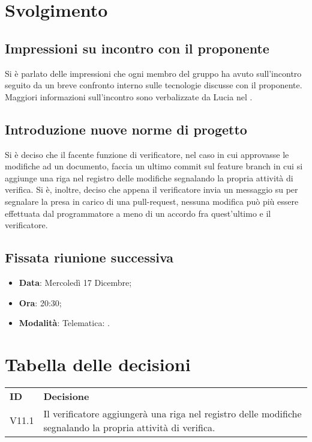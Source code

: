 \documentclass[]{article}
\begin{document}
	\newpage

	\section{Svolgimento}
		\subsection{Impressioni su incontro con il proponente}
		Si è parlato delle impressioni che ogni membro del gruppo ha avuto sull'incontro seguito da un breve confronto interno sulle tecnologie discusse con il proponente. Maggiori informazioni sull'incontro sono verbalizzate da Lucia nel .\\

		\subsection{Introduzione nuove norme di progetto}
		Si è deciso che il facente funzione di verificatore, nel caso in cui approvasse le modifiche ad un documento, faccia un ultimo commit sul feature branch in cui si aggiunge una riga nel registro delle modifiche segnalando la propria attività di verifica.
		Si è, inoltre, deciso che appena il verificatore invia un messaggio su  per segnalare la presa in carico di una pull-request, nessuna modifica può più essere effettuata dal programmatore a meno di un accordo fra quest'ultimo e il verificatore.\\

		\subsection{Fissata riunione successiva}
		\begin{itemize}
			\item \textbf{Data}: Mercoledì 17 Dicembre;
			\item \textbf{Ora}: 20:30;
			\item \textbf{Modalità}: Telematica: .
		\end{itemize}
	
	\newpage
	
	\section{Tabella delle decisioni}
	
	\begin{table} [h!]
		\begin{center}
			\begin{tabular} { m{2cm} m{14cm} }
				\rowcolor{lightgray}
				\textbf{ID} & \textbf{Decisione}\\
				V11.1 & Il verificatore aggiungerà una riga nel registro delle modifiche segnalando la propria attività di verifica.
			\end{tabular}
		\end{center}
	\end{table}
\end{document}
